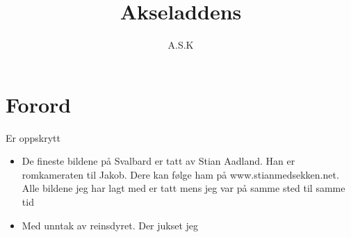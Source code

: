 \documentclass[norsk,10pt,twoside]{book}
\author{A.S.K}
\title{Akseladdens}
\date{}
\begin{document}
\pagestyle{empty} %
\chapter*{Forord}
Er oppskrytt

\begin{itemize}
		
\item \footnotesize{De fineste bildene på Svalbard er tatt av Stian Aadland.
	Han er romkameraten til Jakob. Dere kan følge ham på
	www.stianmedsekken.net. Alle bildene jeg har lagt med er tatt
mens jeg var på samme sted til samme tid}

\item \footnotesize{Med unntak av reinsdyret. Der jukset jeg}
\end{itemize}







\end{document}
